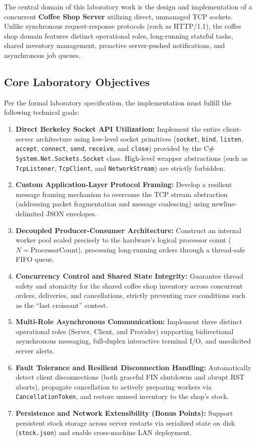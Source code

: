\documentclass[12pt,a4paper]{article}
\begin{document}
The central domain of this laboratory work is the design and implementation of a concurrent \textbf{Coffee Shop Server} utilizing direct, unmanaged TCP sockets. Unlike synchronous request-response protocols (such as HTTP/1.1), the coffee shop domain features distinct operational roles, long-running stateful tasks, shared inventory management, proactive server-pushed notifications, and asynchronous job queues.

\subsection{Core Laboratory Objectives}
Per the formal laboratory specification, the implementation must fulfill the following technical goals:
\begin{enumerate}
    \item \textbf{Direct Berkeley Socket API Utilization:} Implement the entire client-server architecture using low-level socket primitives (\texttt{socket}, \texttt{bind}, \texttt{listen}, \texttt{accept}, \texttt{connect}, \texttt{send}, \texttt{receive}, and \texttt{close}) provided by the C\# \texttt{System.Net.Sockets.Socket} class. High-level wrapper abstractions (such as \texttt{TcpListener}, \texttt{TcpClient}, and \texttt{NetworkStream}) are strictly forbidden.
    \item \textbf{Custom Application-Layer Protocol Framing:} Develop a resilient message framing mechanism to overcome the TCP stream abstraction (addressing packet fragmentation and message coalescing) using newline-delimited JSON envelopes.
    \item \textbf{Decoupled Producer-Consumer Architecture:} Construct an internal worker pool scaled precisely to the hardware's logical processor count ($N = \text{ProcessorCount}$), processing long-running orders through a thread-safe FIFO queue.
    \item \textbf{Concurrency Control and Shared State Integrity:} Guarantee thread safety and atomicity for the shared coffee shop inventory across concurrent orders, deliveries, and cancellations, strictly preventing race conditions such as the ``last croissant'' contest.
    \item \textbf{Multi-Role Asynchronous Communication:} Implement three distinct operational roles (Server, Client, and Provider) supporting bidirectional asynchronous messaging, full-duplex interactive terminal I/O, and unsolicited server alerts.
    \item \textbf{Fault Tolerance and Resilient Disconnection Handling:} Automatically detect client disconnections (both graceful FIN shutdowns and abrupt RST aborts), propagate cancellation to actively preparing workers via \texttt{CancellationToken}, and restore unused inventory to the shop's stock.
    \item \textbf{Persistence and Network Extensibility (Bonus Points):} Support persistent stock storage across server restarts via serialized state on disk (\texttt{stock.json}) and enable cross-machine LAN deployment.
\end{enumerate}
\end{document}

